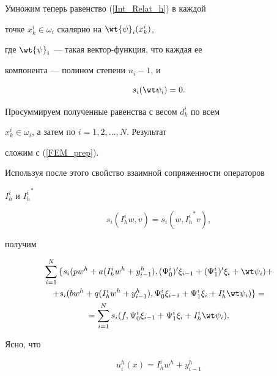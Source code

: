 Умножим теперь равенство (\ref{Int_Relat_h}) в каждой


точке $x_k^i \in \omega_i$ скалярно на $\wt{\psi}_i(x_k^i)$,


где $\wt{\psi}_i$ --- такая вектор-функция, что каждая ее


компонента --- полином степени $n_i-1$, и


\begin{equation} \label{psi_Int_h}


s_i(\wt \psi_i)=0.


\end{equation}


Просуммируем полученные равенства с весом $d_k^i$ по всем


$x_k^i \in \omega_i$, а затем по $i=1,2, \dotsc,N$. Результат


сложим с (\ref{FEM_prep}).


Используя после этого свойство взаимной сопряженности операторов


$I_h^i$ и ${I_h^i}^*$ \cite{DautPaim}


$$


s_i(I_h^i w,v)=s_i(w,{I_h^i}^*v),


$$


получим


\begin{multline}


\label{FEM_Int}


\sum_{i=1}^N {\{ s_i(pw^h+a(I_h^i w^h +


y_{i-1}^h),(\Psi_0^i)'\xi_{i -1}+(\Psi_1^i


)'\xi_i+\wt \psi_i)+}\\


%


+s_i(bw^h+q(I_h^i w^h+y_{i-1}^h),\Psi_0^i \xi_{i-1}


+\Psi_1^i \xi_i +I_h^i \wt \psi_i)\} =\\


%


=\sum_{i=1}^N {s_i(f,\Psi_0^i \xi_{i-1}+\Psi_1^i \xi_i


+I_h^i \wt \psi_i)}.


\end{multline}


Ясно, что


\begin{equation} \label{u^h_w^h_y^h}


u^h_i(x)=I_h^i w^h+y_{i-1}^h


\end{equation}


